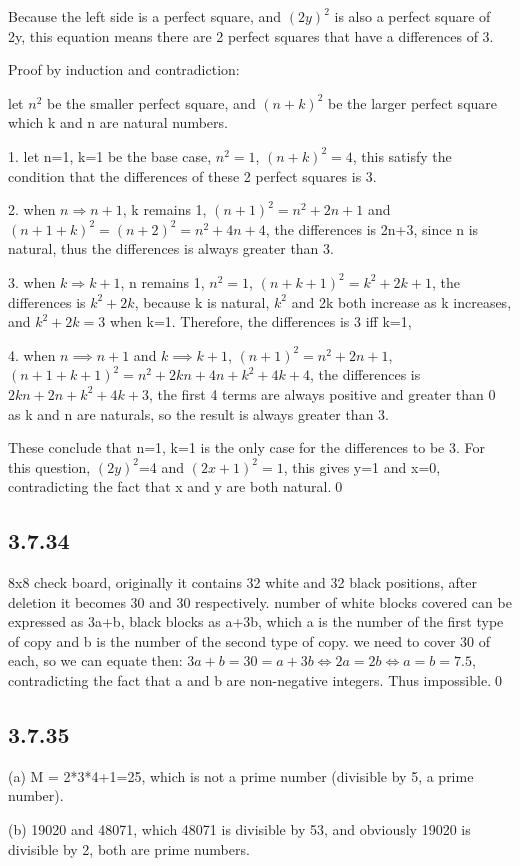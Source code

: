 \documentclass{article}
\begin{document}
Because the left side is a perfect square, and $(2y)^2$ is also a perfect square of 2y, this equation means there are 2 perfect squares that have a differences of 3. 

Proof by induction and contradiction:

let $n^2$ be the smaller perfect square, and $(n+k)^2$ be the larger perfect square which k and n are natural numbers.

1. let n=1, k=1 be the base case, $n^2=1$, $(n+k)^2=4$, this satisfy the condition that the differences of these 2 perfect squares is 3.

2. when $n \Rightarrow n+1$, k remains 1, $(n+1)^2=n^2+2n+1$ and $(n+1+k)^2=(n+2)^2=n^2+4n+4$, the differences is 2n+3, since n is natural, thus the differences is always greater than 3.

3. when $k \Rightarrow k+1$, n remains 1, $n^2=1$, $(n+k+1)^2=k^2+2k+1$, the differences is $k^2+2k$, because k is natural, $k^2$ and 2k both increase as k increases, and $k^2+2k=3$ when k=1. Therefore, the differences is 3 iff k=1,

4. when $n\implies n+1$ and $k\implies k+1$, $(n+1)^2=n^2+2n+1$, $(n+1+k+1)^2=n^2+2kn+4n+k^2+4k+4$, the differences is $2kn+2n+k^2+4k+3$, the first 4 terms are always positive and greater than 0 as k and n are naturals, so the result is always greater than 3.

These conclude that n=1, k=1 is the only case for the differences to be 3. For this question, $(2y)^2$=4 and $(2x+1)^2=1$, this gives y=1 and x=0, contradicting the fact that x and y are both natural.\qed

\subsection*{3.7.34}

8x8 check board, originally it contains 32 white and 32 black positions, after deletion it becomes 30 and 30 respectively. number of white blocks covered can be expressed as 3a+b, black blocks as a+3b, which a is the number of the first type of copy and b is the number of the second type of copy. we need to cover 30 of each, so we can equate then: $3a+b=30=a+3b \iff 2a=2b \iff a=b=7.5$, contradicting the fact that a and b are non-negative integers. Thus impossible.\qed

\subsection*{3.7.35}

(a) M = 2*3*4+1=25, which is not a prime number (divisible by 5, a prime number).

(b) 19020 and 48071, which 48071 is divisible by 53, and obviously 19020 is divisible by 2, both are prime numbers. 

 
\end{document}
